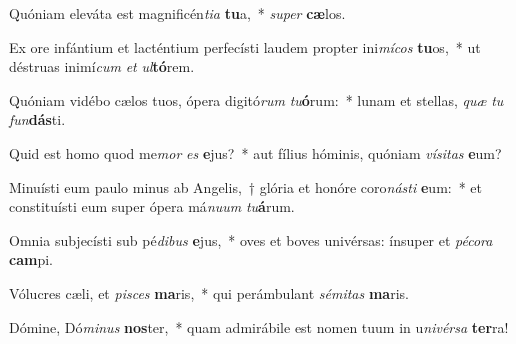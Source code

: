 \item Quóniam eleváta est magnificén\textit{ti}\textit{a} \textbf{tu}a,~* \textit{su}\textit{per} \textbf{cæ}los.
\item Ex ore infántium et lacténtium perfecísti laudem propter ini\textit{mí}\textit{cos} \textbf{tu}os,~* ut déstruas inimí\textit{cum} \textit{et} \textit{ul}\textbf{tó}rem.
\item Quóniam vidébo cælos tuos, ópera digitó\textit{rum} \textit{tu}\textbf{ó}rum:~* lunam et stellas, \textit{quæ} \textit{tu} \textit{fun}\textbf{dás}ti.
\item Quid est homo quod me\textit{mor} \textit{es} \textbf{e}jus?~* aut fílius hóminis, quóniam \textit{ví}\textit{si}\textit{tas} \textbf{e}um?
\item Minuísti eum paulo minus ab Angelis,~† glória et honóre coro\textit{nás}\textit{ti} \textbf{e}um:~* et constituísti eum super ópera má\textit{nu}\textit{um} \textit{tu}\textbf{á}rum.
\item Omnia subjecísti sub pé\textit{di}\textit{bus} \textbf{e}jus,~* oves et boves univérsas: ínsuper et \textit{pé}\textit{co}\textit{ra} \textbf{cam}pi.
\item Vólucres cæli, et \textit{pi}\textit{sces} \textbf{ma}ris,~* qui perámbulant \textit{sé}\textit{mi}\textit{tas} \textbf{ma}ris.
\item Dómine, Dó\textit{mi}\textit{nus} \textbf{nos}ter,~* quam admirábile est nomen tuum in u\textit{ni}\textit{vér}\textit{sa} \textbf{ter}ra!
